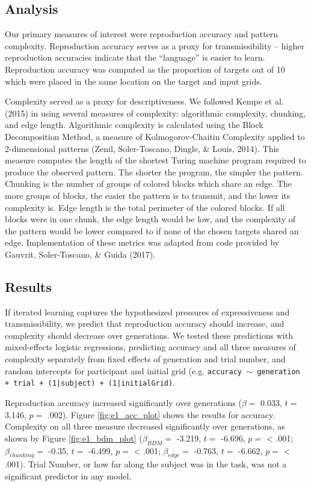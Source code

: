 \documentclass[10pt, letterpaper]{article}
\begin{document}
\subsection{Analysis}\label{analysis}

Our primary measures of interest were reproduction accuracy and pattern
complexity. Reproduction accuracy serves as a proxy for transmissibility
-- higher reproduction accuracies indicate that the ``language'' is
easier to learn. Reproduction accuracy was computed as the proportion of
targets out of 10 which were placed in the same location on the target
and input grids.

Complexity served as a proxy for descriptiveness. We followed Kempe et
al. (2015) in using several measures of complexity: algorithmic
complexity, chunking, and edge length. Algorithmic complexity is
calculated using the Block Decomposition Method, a measure of
Kolmogorov-Chaitin Complexity applied to 2-dimensional patterns (Zenil,
Soler-Toscano, Dingle, \& Louis, 2014). This measure computes the length
of the shortest Turing machine program required to produce the observed
pattern. The shorter the program, the simpler the pattern. Chunking is
the number of groups of colored blocks which share an edge. The more
groups of blocks, the easier the pattern is to transmit, and the lower
its complexity is. Edge length is the total perimeter of the colored
blocks. If all blocks were in one chunk, the edge length would be low,
and the complexity of the pattern would be lower compared to if none of
the chosen targets shared an edge. Implementation of these metrics was
adapted from code provided by Gauvrit, Soler-Toscano, \& Guida (2017).

\subsection{Results}\label{results}

If iterated learning captures the hypothesized pressures of
expressiveness and transmissibility, we predict that reproduction
accuracy should increase, and complexity should decrease over
generations. We tested these predictions with mixed-effects logistic
regressions, predicting accuracy and all three measures of complexity
separately from fixed effects of generation and trial number, and random
intercepts for participant and initial grid (e.g.
\texttt{accuracy $\sim$ generation + trial +  (1|subject) + (1|initialGrid)}.

Reproduction accuracy increased significantly over generations
(\(\beta =\) 0.033, \(t =\) 3.146, \(p =\) .002). Figure
\ref{fig:e1_acc_plot} shows the results for accuracy. Complexity on all
three measure decreased significantly over generations, as shown by
Figure \ref{fig:e1_bdm_plot} (\(\beta_{BDM} =\) -3.219, \(t =\) -6.696,
\(p =\) \textless{} .001; \(\beta_{chunking} =\) -0.35, \(t =\) -6.499,
\(p =\) \textless{} .001; \(\beta_{edge} =\) -0.763, \(t =\) -6.662,
\(p =\) \textless{} .001). Trial Number, or how far along the subject
was in the task, was not a significant predictor in any model.
\end{document}
